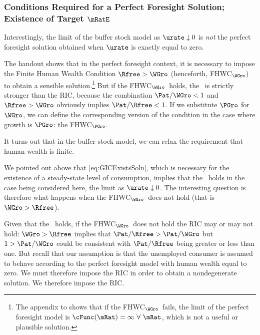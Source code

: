 \documentclass{\handout}
\begin{document}
\subsubsection{Conditions Required for a Perfect Foresight Solution; Existence of Target $\mRatE$}

Interestingly, the limit of the buffer stock model as $\urate \downarrow 0$ is {\it not} the perfect foresight solution obtained when $\urate$ is exactly equal to zero.%

\providecommand{\FHWCPGro}{FHWC$_{\PGro}$}
\providecommand{\FHWCWGro}{FHWC$_{\WGro}$}
The handout  shows that in the perfect foresight context, it is necessary to impose the Finite Human Wealth Condition $\Rfree > \WGro$ (henceforth, \FHWCWGro) to obtain a sensible solution.\footnote{The appendix to  shows that if the \FHWCWGro~fails, the limit of the perfect foresight model is $\cFunc(\mRat)=\infty~\forall~\mRat$, which is not a useful or plausible solution.}  But if the \FHWCWGro~holds, the \GICWGro~is strictly stronger than the RIC, because the combination $\Pat/\WGro < 1$ and $\Rfree > \WGro$ obviously implies $\Pat/\Rfree < 1$.  If we substitute $\PGro$ for $\WGro$, we can define the corresponding version of the condition in the case where growth is $\PGro$: the \FHWCPGro.

It turns out that in the buffer stock model, we can relax the requirement that human wealth is finite.  

We pointed out above that \eqref{eq:GICExistsSoln}, which is necessary for the existence of a steady-state level of consumption, implies that the \GICPGro~holds in the case being considered here, the limit as $\urate \downarrow 0$.  The interesting question is therefore what happens when the \FHWCWGro~does not hold (that is $\WGro > \Rfree$).  

Given that the \GICWGro~holds, if the \FHWCWGro~does not hold the RIC may or may not hold:  $\WGro > \Rfree$ implies that $\Pat/\Rfree > \Pat/\WGro$ but $1 > \Pat/\WGro$ could be consistent with $\Pat/\Rfree$ being greater or less than one.  But recall that our assumption is that the unemployed consumer is assumed to behave according to the perfect foresight model with human wealth equal to zero.  We must therefore impose the RIC in order to obtain a nondegenerate solution.  We therefore impose the RIC.
\end{document}
